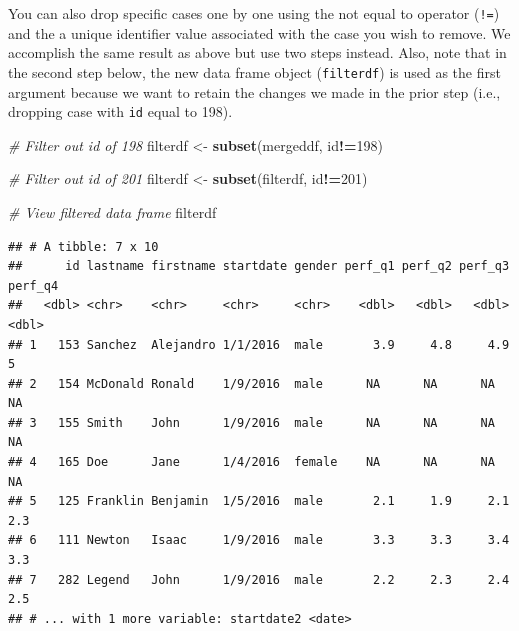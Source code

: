 \documentclass[]{book}
\newenvironment{Shaded}{\begin{snugshade}}{\end{snugshade}}
\newcommand{\KeywordTok}[1]{\textcolor[rgb]{0.13,0.29,0.53}{\textbf{#1}}}
\newcommand{\DecValTok}[1]{\textcolor[rgb]{0.00,0.00,0.81}{#1}}
\newcommand{\StringTok}[1]{\textcolor[rgb]{0.31,0.60,0.02}{#1}}
\newcommand{\CommentTok}[1]{\textcolor[rgb]{0.56,0.35,0.01}{\textit{#1}}}
\newcommand{\OperatorTok}[1]{\textcolor[rgb]{0.81,0.36,0.00}{\textbf{#1}}}
\newcommand{\NormalTok}[1]{#1}
\begin{document}
You can also drop specific cases one by one using the not equal to
operator (\texttt{!=}) and the a unique identifier value associated with
the case you wish to remove. We accomplish the same result as above but
use two steps instead. Also, note that in the second step below, the new
data frame object (\texttt{filterdf}) is used as the first argument
because we want to retain the changes we made in the prior step (i.e.,
dropping case with \texttt{id} equal to 198).

\begin{Shaded}
\begin{Highlighting}[]
\CommentTok{# Filter out id of 198}
\NormalTok{filterdf <-}\StringTok{ }\KeywordTok{subset}\NormalTok{(mergeddf, id}\OperatorTok{!=}\DecValTok{198}\NormalTok{)}

\CommentTok{# Filter out id of 201}
\NormalTok{filterdf <-}\StringTok{ }\KeywordTok{subset}\NormalTok{(filterdf, id}\OperatorTok{!=}\DecValTok{201}\NormalTok{)}

\CommentTok{# View filtered data frame}
\NormalTok{filterdf}
\end{Highlighting}
\end{Shaded}

\begin{verbatim}
## # A tibble: 7 x 10
##      id lastname firstname startdate gender perf_q1 perf_q2 perf_q3 perf_q4
##   <dbl> <chr>    <chr>     <chr>     <chr>    <dbl>   <dbl>   <dbl>   <dbl>
## 1   153 Sanchez  Alejandro 1/1/2016  male       3.9     4.8     4.9     5  
## 2   154 McDonald Ronald    1/9/2016  male      NA      NA      NA      NA  
## 3   155 Smith    John      1/9/2016  male      NA      NA      NA      NA  
## 4   165 Doe      Jane      1/4/2016  female    NA      NA      NA      NA  
## 5   125 Franklin Benjamin  1/5/2016  male       2.1     1.9     2.1     2.3
## 6   111 Newton   Isaac     1/9/2016  male       3.3     3.3     3.4     3.3
## 7   282 Legend   John      1/9/2016  male       2.2     2.3     2.4     2.5
## # ... with 1 more variable: startdate2 <date>
\end{verbatim}
\end{document}
